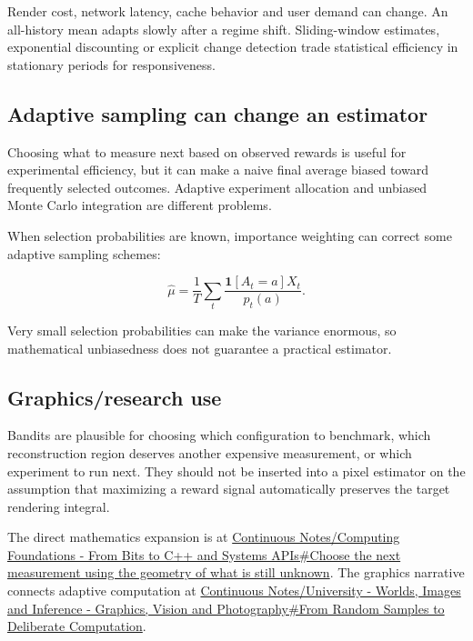 \hypertarget{appendix-3dc863dbddf3-nonstationary-workloads}{}

Render cost, network latency, cache behavior and user demand can change. An all-history mean adapts slowly after a regime shift. Sliding-window estimates, exponential discounting or explicit change detection trade statistical efficiency in stationary periods for responsiveness.

\subsection{Adaptive sampling can change an estimator}\label{appendix-3dc863dbddf3-adaptive-sampling-can-change-an-estimator}

\hypertarget{appendix-3dc863dbddf3-adaptive-sampling-can-change-an-estimator}{}

Choosing what to measure next based on observed rewards is useful for experimental efficiency, but it can make a naive final average biased toward frequently selected outcomes. Adaptive experiment allocation and unbiased Monte Carlo integration are different problems.

When selection probabilities are known, importance weighting can correct some adaptive sampling schemes:

\[
\hat\mu=
\frac1T\sum_t
\frac{\mathbf 1[A_t=a]X_t}{p_t(a)}.
\]

Very small selection probabilities can make the variance enormous, so mathematical unbiasedness does not guarantee a practical estimator.

\subsection{Graphics/research use}\label{appendix-3dc863dbddf3-graphicsresearch-use}

\hypertarget{appendix-3dc863dbddf3-graphicsresearch-use}{}

Bandits are plausible for choosing which configuration to benchmark, which reconstruction region deserves another expensive measurement, or which experiment to run next. They should not be inserted into a pixel estimator on the assumption that maximizing a reward signal automatically preserves the target rendering integral.

The direct mathematics expansion is at \hyperref[02-foundations-ii-ch030-choose-the-next-measurement-using-the-geometry-of-what-is-still-unknown]{Continuous Notes/Computing Foundations - From Bits to C++ and Systems APIs\#Choose the next measurement using the geometry of what is still unknown}. The graphics narrative connects adaptive computation at \hyperref[03-visual-computing-i-ch012-from-random-samples-to-deliberate-computation]{Continuous Notes/University - Worlds, Images and Inference - Graphics, Vision and Photography\#From Random Samples to Deliberate Computation}.

